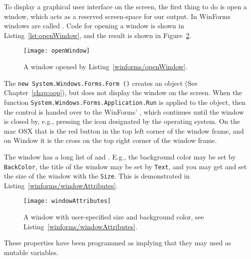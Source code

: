 To display a graphical user interface on the screen, the first thing to do is open a window, which acts as a reserved screen-space for our output. In WinForms windows are called . Code for opening a window is shown in Listing~\ref{lst:openWindow}, and the result is shown in Figure~\ref{fig:openWindow}.
%
%
%
%
\begin{figure}
  \centering
  \texttt{[image: openWindow]}
  \caption{A window opened by Listing~\ref{winforms/openWindow}.}
  \label{fig:openWindow}
\end{figure}
The \lstinline!new System.Windows.Forms.Form ()! creates an object (See Chapter~\ref{chap:oop}), but does not display the window on the screen. When the function \lstinline!System.Windows.Forms.Application.Run! is applied to the object, then the control is handed over to the WinForms' , which continues until the window is closed by, e.g., pressing the icon designated by the operating system. On the mac OSX that is the red button in the top left corner of the window frame, and on Window it is the cross on the top right corner of the window frame.

The window has a long list of  and . E.g., the background color may be set by \lstinline!BackColor!, the title of the window may be set by \lstinline!Text!, and you may get and set the size of the window with the \lstinline!Size!. This is demonstrated in Listing~\ref{winforms/windowAttributes}.
%
%
\begin{figure}
  \centering
  \texttt{[image: windowAttributes]}
  \caption{A window with user-specified size and background color, see Listing~\ref{winforms/windowAttributes}.}
  \label{fig:openWindow}
\end{figure}
These properties have been programmed as  implying that they may used as mutable variables. 

